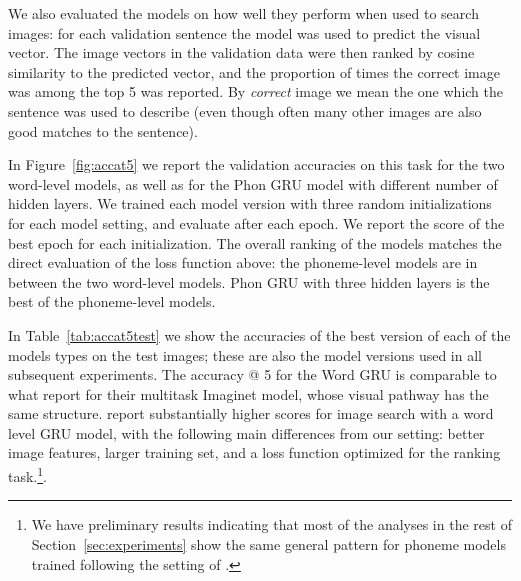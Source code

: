 We also evaluated the models on how well they perform when used to
search images: for each validation sentence the model was used to predict the
visual vector. The image vectors in the validation data were then
ranked by cosine similarity to the predicted vector, and the
proportion of times the correct image was among the top 5 was
reported. By {\it correct} image we mean the one which the sentence
was used to describe (even though often many other images are also
good matches to the sentence). 

In Figure~\ref{fig:accat5} we report the validation accuracies on this
task for the two word-level models, as well as for the Phon GRU
model with different number of hidden layers. We trained each model
version with three random initializations for each model setting, and
evaluate after each epoch. We report the score of the best epoch for
each initialization. 
The overall ranking of the models matches the direct
evaluation of the loss function above: the phoneme-level models are in
between the two word-level models. {\sc Phon GRU} with three
hidden layers is the best of the phoneme-level models.

In Table~\ref{tab:accat5test} we show the accuracies of the best
version of each of the models types on the test images; these are also
the model versions used in all subsequent experiments. The accuracy @
5 for the {\sc Word GRU} is comparable to what
 report for their multitask {\sc
  Imaginet} model, whose visual pathway has the same
structure.  report substantially higher
scores for image search with a word level GRU model, with the
following main differences from our setting: better image features,
larger training set, and a loss function optimized for the ranking
task.\footnote{We have preliminary results indicating that most of the
  analyses in the rest of Section~\ref{sec:experiments} show the same general
  pattern for phoneme models trained following the setting of
  .}.

